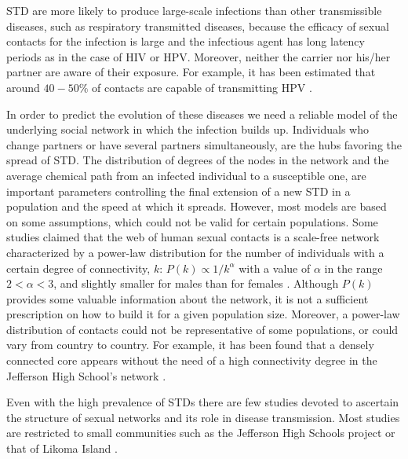 STD are more likely to produce large-scale infections than other transmissible diseases, such as respiratory transmitted diseases, because the efficacy of sexual contacts for the infection is large and the infectious agent has long latency periods as in the case of HIV or HPV. Moreover, neither the carrier nor his/her partner are aware of their exposure. For example, it has been estimated that around $40-50\%$ of contacts are capable of transmitting HPV \cite{burchell2006modeling}.

In order to predict the evolution of these diseases we need a reliable model of the underlying social network in which the infection builds up. Individuals who change partners or have several partners simultaneously, are the hubs favoring the spread of STD. The distribution of degrees of the nodes in the network and the average chemical path from an infected individual to a susceptible one, are important parameters controlling the final extension of a new STD in a population and the speed at which it spreads. However, most models are based on some assumptions, which could not be valid for certain populations. Some studies claimed that the web of human sexual contacts is a scale-free network characterized by a power-law distribution for the number of individuals with a certain degree of connectivity, $k$: $P(k)\propto 1/k^\alpha$ with a value of $\alpha$ in the range $2 <\alpha < 3$, and slightly smaller for males than for females \cite{liljeros2001web}. Although $P(k)$ provides some valuable information about the network, it is not a sufficient prescription on how to build it for a given population size. Moreover, a power-law distribution of contacts could not be representative of some populations, or could vary from country to country. For example, it has been found that a densely connected core appears without the need of a high connectivity degree in the Jefferson High School's network \cite{bearman2004chains}. 

Even with the high prevalence of STDs there are few studies devoted to ascertain the structure of sexual networks and its role in disease transmission. Most studies are restricted to small communities such as the Jefferson High Schools project \cite{bearman2004chains} or that of Likoma Island \cite{helleringer2007sexual}.

